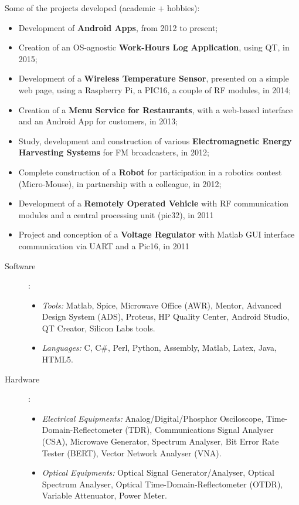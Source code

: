 \documentclass[helvetica,openbib,totpages]{europecv}
\begin{document}
\begin{europecv}
{Some of the projects developed (academic + hobbies):
\begin{itemize}
	\item Development of \textbf{Android Apps}, from 2012 to present;
	\item Creation of an OS-agnostic \textbf{Work-Hours Log Application}, using QT, in 2015;
	\item Development of a \textbf{Wireless Temperature Sensor}, presented on a simple web page, using a Raspberry Pi, a PIC16, a couple of RF modules, in 2014;
	\item Creation of a \textbf{Menu Service for Restaurants}, with a web-based interface and an Android App for customers, in 2013;
	\item Study, development and construction of various \textbf{Electromagnetic Energy Harvesting Systems} for FM broadcasters, in 2012;
	\item Complete construction of a \textbf{Robot} for participation in a robotics contest (Micro-Mouse), in partnership with a colleague, in 2012;
	\item Development of a \textbf{Remotely Operated Vehicle} with RF communication modules and a central processing unit (pic32), in 2011
	\item Project and conception of a \textbf{Voltage Regulator} with Matlab GUI interface communication via UART and a Pic16, in 2011
\end{itemize}}


{
\begin{description}
	\item[Software]:
	\begin{itemize}
		\item \textit{Tools:} Matlab, Spice, Microwave Office (AWR), Mentor, Advanced Design System (ADS), Proteus, HP Quality Center, Android Studio, QT Creator, Silicon Labs tools.
		\item \textit{Languages:} C, C\#, Perl, Python, Assembly, Matlab, Latex, Java, HTML5.
	\end{itemize}
	\item[Hardware]:
	\begin{itemize}
		\item \textit{Electrical Equipments:} Analog/Digital/Phosphor Osciloscope, Time-Domain-Reflectometer (TDR), Communications Signal Analyser (CSA), Microwave Generator, Spectrum Analyser, Bit Error Rate Tester (BERT), Vector Network Analyser (VNA).
		\item \textit{Optical Equipments:} Optical Signal Generator/Analyser, Optical Spectrum Analyser, Optical Time-Domain-Reflectometer (OTDR), Variable Attenuator, Power Meter.
	\end{itemize}
\end{description} 
}


\end{europecv}
\end{document}
